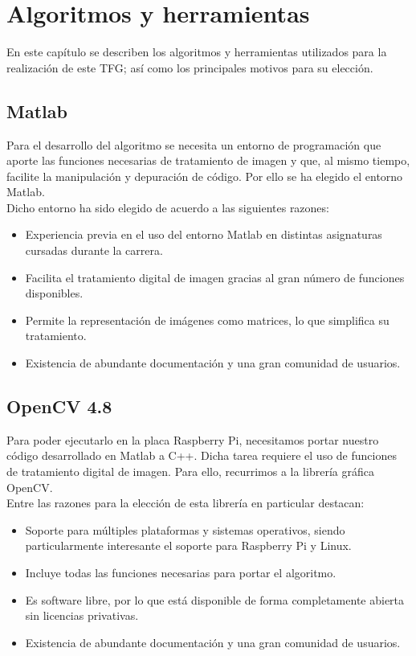 \chapter{Algoritmos y herramientas}
En este capítulo se describen los algoritmos y herramientas utilizados para la realización de este \ac{TFG}; así como los principales motivos para su elección.

\section{Matlab}
Para el desarrollo del algoritmo se necesita un entorno de programación que aporte las funciones necesarias de tratamiento de imagen y que, al mismo tiempo, facilite la manipulación y depuración de código. Por ello se ha elegido el entorno Matlab.\\

Dicho entorno ha sido elegido de acuerdo a las siguientes razones:
\begin{itemize}
\item Experiencia previa en el uso del entorno Matlab en distintas asignaturas cursadas durante la carrera.
\item Facilita el tratamiento digital de imagen gracias al gran número de funciones disponibles.
\item Permite la representación de imágenes como matrices, lo que simplifica su tratamiento.
\item Existencia de abundante documentación y una gran comunidad de usuarios.
\end{itemize}

\section{OpenCV 4.8}
Para poder ejecutarlo en la placa Raspberry Pi, necesitamos portar nuestro código desarrollado en Matlab a C++. Dicha tarea requiere el uso de funciones de tratamiento digital de imagen. Para ello, recurrimos a la librería gráfica OpenCV.\\

Entre las razones para la elección de esta librería en particular destacan:
\begin{itemize}
\item Soporte para múltiples plataformas y sistemas operativos, siendo particularmente interesante el soporte para Raspberry Pi y Linux.
\item Incluye todas las funciones necesarias para portar el algoritmo.
\item Es software libre, por lo que está disponible de forma completamente abierta sin licencias privativas.
\item Existencia de abundante documentación y una gran comunidad de usuarios.
\end{itemize}

